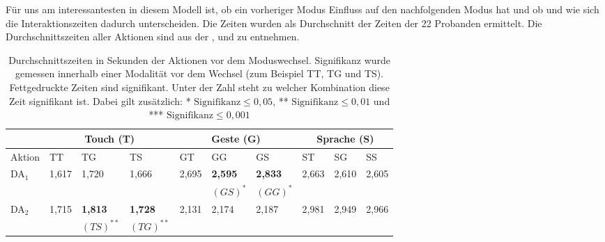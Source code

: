 Für uns am interessantesten in diesem Modell ist, ob ein vorheriger Modus Einfluss auf den nachfolgenden Modus hat und ob und wie sich die Interaktionszeiten dadurch unterscheiden. 
Die Zeiten wurden als Durchschnitt der Zeiten der 22 Probanden ermittelt. 
Die Durchschnittszeiten aller Aktionen sind aus der ,  und  zu entnehmen. 
\begin{table}[ht]
  \centering
	\begin{tabular}{|l|l|l|l|l|l|l|l|l|l|}
		\hline
		& \multicolumn{3}{|c|}{Touch (T)} & \multicolumn{3}{|c|}{Geste (G)}&\multicolumn{3}{|c|}{Sprache (S)}\\
		\hline
		Aktion 					& TT 		& TG 		& TS 		& GT 		& GG 		& GS 		& ST 		& SG 		& SS\\
		\hline
		DA$_1$ 	& 1,617 & 1,720	& 1,666 &	2,695	&	\textbf{2,595}	&	\textbf{2,833}	&	2,663	& 2,610	& 2,605\\
					&  			&  			&				&				&		\small{$(GS)^*$}					&	\small{$(GG)^*$}			 			&		&	& \\
		\hline
		DA$_2$ 	& 1,715 & \textbf{1,813}	& \textbf{1,728}	&	2,131	&	2,174	&	2,187	&	2,981	&	2,949	& 2,966\\
					&  			& \small{$(TS)^{**}$}				&	\small{$(TG)^{**}$}			&				&				&				&		&	& \\
		\hline			
  \end{tabular}
	\caption[Durchschnittszeiten der Aktionen vor dem Moduswechsel]{Durchschnittszeiten in Sekunden der Aktionen vor dem Moduswechsel. Signifikanz wurde gemessen innerhalb einer Modalität vor dem Wechsel (zum Beispiel TT, TG und TS). Fettgedruckte Zeiten sind signifikant. Unter der Zahl steht zu welcher Kombination diese Zeit signifikant ist. Dabei gilt zusätzlich: * $\text{Signifikanz} \leq 0,05$, ** $\text{Signifikanz} \leq 0,01$ und *** $\text{Signifikanz} \leq 0,001$}
\label{tab:OperatorzeitenVorWechsel1}
\end{table}

